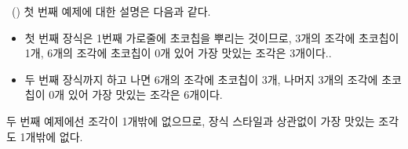 \begin{problem}{\kcpcprobcake\ (\kcpcprobcakeshort)}
    \Explanation
    첫 번째 예제에 대한 설명은 다음과 같다.
    \begin{itemize}
    \item 첫 번째 장식은 1번째 가로줄에 초코칩을 뿌리는 것이므로, 3개의 조각에 초코칩이 1개, 6개의 조각에 초코칩이 0개 있어 가장 맛있는 조각은 3개이다..
    
    \item 두 번째 장식까지 하고 나면 6개의 조각에 초코칩이 3개, 나머지 3개의 조각에 초코칩이 0개 있어 가장 맛있는 조각은 6개이다.
    \end{itemize}
    
    두 번째 예제에선 조각이 1개밖에 없으므로, 장식 스타일과 상관없이 가장 맛있는 조각도 1개밖에 없다.
\end{problem}

